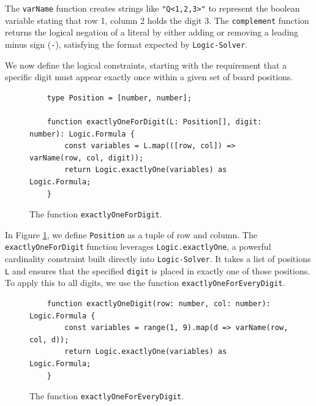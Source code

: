 The \texttt{varName} function creates strings like \texttt{"Q<1,2,3>"} to represent the boolean variable
stating that row 1, column 2 holds the digit 3. The \texttt{complement} function returns the logical negation
of a literal by either adding or removing a leading minus sign (\texttt{-}), satisfying the format expected by
\texttt{Logic-Solver}. 

We now define the logical constraints, starting with the requirement that a specific digit must appear exactly
once within a given set of board positions. 

\begin{figure}[!ht]
  \centering
\begin{verbatim}
    type Position = [number, number];
              
    function exactlyOneForDigit(L: Position[], digit: number): Logic.Formula {
        const variables = L.map(([row, col]) => varName(row, col, digit));
        return Logic.exactlyOne(variables) as Logic.Formula;
    }
\end{verbatim}
\vspace*{-0.3cm}
  \caption{The function \texttt{exactlyOneForDigit}.}
  \label{fig:logicsolver-exactlyOneForDigit}
\end{figure}

In Figure \ref{fig:logicsolver-exactlyOneForDigit}, we define \texttt{Position} as a tuple of row and
column. The \texttt{exactlyOneForDigit} function leverages \texttt{Logic.exactlyOne}, a powerful cardinality
constraint built directly into \texttt{Logic-Solver}. It takes a list of positions \texttt{L} and ensures that
the specified \texttt{digit} is placed in exactly one of those positions. 
To apply this to all digits, we use the function \texttt{exactlyOneForEveryDigit}.

\begin{figure}[!ht]
  \centering
\begin{verbatim}
    function exactlyOneDigit(row: number, col: number): Logic.Formula {
        const variables = range(1, 9).map(d => varName(row, col, d));
        return Logic.exactlyOne(variables) as Logic.Formula;
    }
\end{verbatim}
\vspace*{-0.3cm}
  \caption{The function \texttt{exactlyOneForEveryDigit}.}
  \label{fig:logicsolver-exactlyOneForEveryDigit}
\end{figure}

